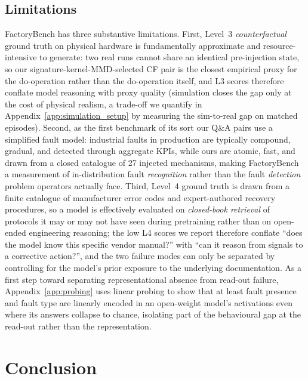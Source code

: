 \subsection{Limitations}

FactoryBench has three substantive limitations. First, Level~3 \emph{counterfactual} ground truth on physical hardware is fundamentally approximate and resource-intensive to generate: two real runs cannot share an identical pre-injection state, so our signature-kernel-MMD-selected CF pair is the closest empirical proxy for the do-operation rather than the do-operation itself, and L3 scores therefore conflate model reasoning with proxy quality (simulation closes the gap only at the cost of physical realism, a trade-off we quantify in Appendix~\ref{app:simulation_setup} by measuring the sim-to-real gap on matched episodes). Second, as the first benchmark of its sort our Q\&A pairs use a simplified fault model: industrial faults in production are typically compound, gradual, and detected through aggregate KPIs, while ours are atomic, fast, and drawn from a closed catalogue of 27 injected mechanisms, making FactoryBench a measurement of in-distribution fault \emph{recognition} rather than the fault \emph{detection} problem operators actually face. Third, Level~4 ground truth is drawn from a finite catalogue of manufacturer error codes and expert-authored recovery procedures, so a model is effectively evaluated on \emph{closed-book retrieval} of protocols it may or may not have seen during pretraining rather than on open-ended engineering reasoning; the low L4 scores we report therefore conflate ``does the model know this specific vendor manual?'' with ``can it reason from signals to a corrective action?'', and the two failure modes can only be separated by controlling for the model's prior exposure to the underlying documentation. As a first step toward separating representational absence from read-out failure, Appendix~\ref{app:probing} uses linear probing to show that at least fault presence and fault type are linearly encoded in an open-weight model's activations even where its answers collapse to chance, isolating part of the behavioural gap at the read-out rather than the representation.

\section{Conclusion}

